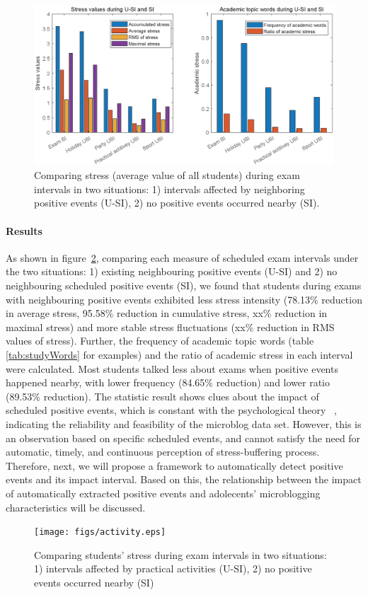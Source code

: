 \begin{figure}[h]
\centering
\includegraphics[width=\linewidth]{figs/barUSI.eps}
\caption{\small{Comparing stress (average value of all students) during exam intervals in two situations:
1) intervals affected by neighboring positive events (U-SI), 2) no positive events occurred nearby (SI).}}
\label{fig:frequency}
\end{figure}

\paragraph{Results}
As shown in figure~\ref{fig:frequency},
comparing each measure of scheduled exam intervals under the two situations: 
1) existing neighbouring positive events (U-SI) and 2) no neighbouring scheduled positive events (SI),
we found that students during exams with neighbouring positive events exhibited less stress intensity
(78.13\% reduction in average stress, 95.58\%  reduction in cumulative stress, xx\%  reduction in maximal stress) 
and more stable stress fluctuations (xx\% reduction in RMS values of stress). 
Further, the frequency of academic topic words (table \ref{tab:studyWords} for examples)
and the ratio of academic stress in each interval were calculated.
Most students talked less about exams when positive events happened nearby,
with lower frequency (84.65\% reduction) and lower ratio (89.53\% reduction).
The statistic result shows clues about the impact of scheduled positive events,
which is constant with the psychological theory ~\citep{Cohen1984Positive, Cohen2010Positive, Needles1990Positive},
indicating the reliability and feasibility of the microblog data set.
However,
this is an observation based on specific scheduled events,
and cannot satisfy the need for automatic, timely, and continuous perception of stress-buffering process.
Therefore, next, we will propose a framework to automatically detect positive events and its impact interval.
Based on this, 
the relationship between the impact of automatically extracted positive events 
and adolecents' microblogging characteristics will be discussed.


\begin{figure}[h]
\centering
\texttt{[image: figs/activity.eps]}
\caption{\small{Comparing students' stress during exam intervals in two situations:
1) intervals affected by practical activities (U-SI), 2) no positive events occurred nearby (SI)}}
\label{fig:frequency}
\end{figure}
